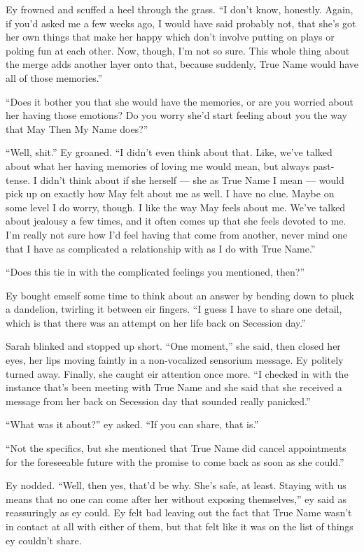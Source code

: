 Ey frowned and scuffed a heel through the grass. ``I don't know, honestly. Again, if you'd asked me a few weeks ago, I would have said probably not, that she's got her own things that make her happy which don't involve putting on plays or poking fun at each other. Now, though, I'm not so sure. This whole thing about the merge adds another layer onto that, because suddenly, True Name would have all of those memories.''

``Does it bother you that she would have the memories, or are you worried about her having those emotions? Do you worry she'd start feeling about you the way that May Then My Name does?''

``Well, shit.'' Ey groaned. ``I didn't even think about that. Like, we've talked about what her having memories of loving me would mean, but always past-tense. I didn't think about if she herself — she as True Name I mean — would pick up on exactly how May felt about me as well. I have no clue. Maybe on some level I do worry, though. I like the way May feels about me. We've talked about jealousy a few times, and it often comes up that she feels devoted to me. I'm really not sure how I'd feel having that come from another, never mind one that I have as complicated a relationship with as I do with True Name.''

``Does this tie in with the complicated feelings you mentioned, then?''

Ey bought emself some time to think about an answer by bending down to pluck a dandelion, twirling it between eir fingers. ``I guess I have to share one detail, which is that there was an attempt on her life back on Secession day.''

Sarah blinked and stopped up short. ``One moment,'' she said, then closed her eyes, her lips moving faintly in a non-vocalized sensorium message. Ey politely turned away. Finally, she caught eir attention once more. ``I checked in with the instance that's been meeting with True Name and she said that she received a message from her back on Secession day that sounded really panicked.''

``What was it about?'' ey asked. ``If you can share, that is.''

``Not the specifics, but she mentioned that True Name did cancel appointments for the foreseeable future with the promise to come back as soon as she could.''

Ey nodded. ``Well, then yes, that'd be why. She's safe, at least. Staying with us means that no one can come after her without exposing themselves,'' ey said as reassuringly as ey could. Ey felt bad leaving out the fact that True Name wasn't in contact at all with either of them, but that felt like it was on the list of things ey couldn't share.

